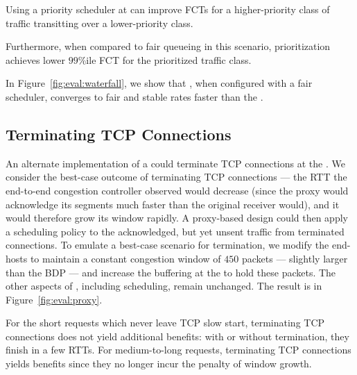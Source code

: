 \label{s:eval:strictprio}
Using a priority scheduler at \name can improve FCTs for a higher-priority class of traffic transitting \name over a lower-priority class. 

Furthermore, when compared to fair queueing in this scenario, prioritization achieves \strictPrioTailImprovementOverFq lower $99$\%ile FCT for the prioritized traffic class.


\label{s:eval:waterfall}
In Figure~\ref{fig:eval:waterfall}, we show that \name, when configured with a fair scheduler, converges to fair and stable rates faster than the \baseline.


\subsection{Terminating TCP Connections}\label{s:eval:proxy}
An alternate implementation of a \name could terminate TCP connections at the \inbox. 
We consider the best-case outcome of terminating TCP connections --- the RTT the end-to-end congestion controller observed would decrease (since the proxy would acknowledge its segments much faster than the original receiver would), and it would therefore grow its window rapidly.
A proxy-based design could then apply a scheduling policy to the acknowledged, but yet unsent traffic from terminated connections.
To emulate a best-case scenario for termination, we modify the end-hosts to maintain a constant congestion window of $450$ packets --- slightly larger than the BDP --- and increase the buffering at the \inbox to hold these packets. 
The other aspects of \name, including scheduling, remain unchanged.
The result is in Figure~\ref{fig:eval:proxy}.
%

%
For the short requests which never leave TCP slow start, terminating TCP connections does not yield additional benefits: with or without termination, they finish in a few RTTs.
For medium-to-long requests, terminating TCP connections yields benefits since they no longer incur the penalty of window growth.

